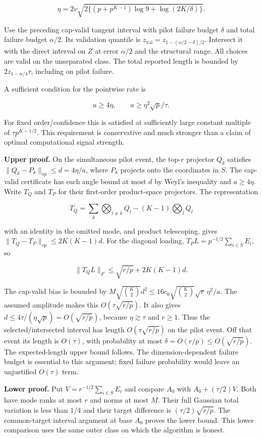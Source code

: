 \[\eta=2v\sqrt{2\{(p+p^{K-1})\log9+\log(2K/\delta)\}}.\]

Use the preceding cap-valid tangent interval with pilot failure budget
\(\delta\) and total failure budget \(\alpha/2\). Its validation
quantile is \(z_{\mathrm{val}}=z_{1-(\alpha/2-\delta)/2}\). Intersect it
with the direct interval on \(Z\) at error \(\alpha/2\) and the
structural range. All choices are valid on the unseparated class. The
total reported length is bounded by \(2z_{1-\alpha/4}\tau\), including
on pilot failure.

A sufficient condition for the pointwise rate is

\[a\ge 4\eta,\qquad a\ge \eta^2\sqrt p/\tau.\]

For fixed order/confidence this is satisfied at sufficiently large
constant multiple of \(\tau p^{K-1/2}\). This requirement is
conservative and much stronger than a claim of optimal computational
signal strength.

\textbf{Upper proof.} On the simultaneous pilot event, the top-\(r\)
projector \(Q_k\) satisfies \(\|Q_k-P_k\|_{op}\le d=4\eta/a\), where
\(P_k\) projects onto the coordinates in \(S\). The cap-valid
certificate has each angle bound at most \(d\) by Weyl's inequality and
\(a\ge4\eta\). Write \(T_Q\) and \(T_P\) for their first-order
product-space projectors. The representation

\[T_Q=\sum_k\bigotimes_{l\ne k}Q_l-(K-1)\bigotimes_l Q_l\]

with an identity in the omitted mode, and product telescoping, gives
\(\|T_Q-T_P\|_{op}\le2K(K-1)d\). For the diagonal loading,
\(T_PL=p^{-1/2}\sum_{i\in S}E_i\), so

\[\|T_QL\|_F\le\sqrt{r/p}+2K(K-1)d.\]

The cap-valid bias is bounded by \(M\sqrt{\binom K2}d^2\le
16c_0\sqrt{\binom K2}\sqrt r\,\eta^2/a\). The assumed amplitude makes
this \(O(\tau\sqrt{r/p})\). It also gives
\(d\le4\tau/(\eta\sqrt p)=O(\sqrt{r/p})\), because \(\eta\gtrsim\tau\)
and \(r\ge1\). Thus the selected/intersected interval has length
\(O(\tau\sqrt{r/p})\) on the pilot event. Off that event its length is
\(O(\tau)\), with probability at most
\(\delta=O(r/p)\le O(\sqrt{r/p})\). The expected-length upper bound
follows. The dimension-dependent failure budget is essential to this
argument; fixed failure probability would leave an unjustified
\(O(\tau)\) term.

\textbf{Lower proof.} Put \(V=r^{-1/2}\sum_{i\in S}E_i\) and compare
\(A_0\) with \(A_0+(\tau/2)V\). Both have mode ranks at most \(r\) and
norms at most \(M\). Their full Gaussian total variation is less than
\(1/4\) and their target difference is \((\tau/2)\sqrt{r/p}\). The
common-target interval argument at base \(A_0\) proves the lower bound.
This lower comparison uses the same outer class on which the algorithm
is honest.

